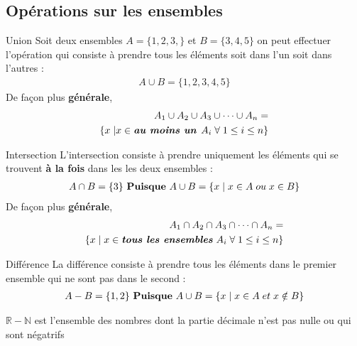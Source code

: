 \documentclass[8pt]{report}
\begin{document}
\begin{multicols*}{2}
\section{Opérations sur les ensembles}
\begin{Definitionx*}{Union}{}
  Soit deux ensembles $A = \{1, 2, 3,\}$ et $B = \{3, 4, 5\}$ on peut effectuer l'opération qui
  consiste à prendre tous les éléments soit dans l'un soit dans l'autres :
  \begin{align*}
    A \cup B = \{1, 2, 3, 4, 5\}
  \end{align*}
  De façon plus \textbf{générale}, 
  \begin{align*}
      A_1\cup A_2\cup A_3\cup\cdots\cup A_n = \\
      \{x \; |  x \in \textbf{\textit{au moins  un }}  A_i \; \forall \; 1 \leq i \leq n\}         
  \end{align*}
\end{Definitionx*} 
\begin{Definitionx*}{Intersection}{}
  L'intersection consiste à prendre uniquement les éléments qui se trouvent \textbf{à la fois} dans les 
  les deux ensembles :
  \begin{align*}
    A \cap B = \{3\} \text{ \textbf{Puisque} } A \cup B = \{x \; | \; x \in A \; ou \;x \in B \}
  \end{align*}
    De façon plus \textbf{générale}, 
  \begin{align*}
    A_1\cap A_2\cap A_3\cap\cdots\cap A_n = \\ 
    \{x \; | \; x \in \textit{\textbf{tous les ensembles} } A_i \; \forall \; 1 \leq i \leq n\}         
  \end{align*}



\end{Definitionx*}

\begin{Definitionx*}{Différence}{}
  La différence consiste à prendre tous les éléments dans le premier ensemble qui ne sont pas dans 
  le second :
  \begin{align*}
    A - B = \{1, 2\} \text{ \textbf{Puisque} } A \cup B = \{x \; | \; x \in A \; et \;x \notin B\}
  \end{align*}
\end{Definitionx*} 

\begin{EExample}{}{}
  $\mathbb{R} - \mathbb{N}$ est l'ensemble des nombres dont la partie décimale n'est pas nulle 
  ou qui sont négatrifs 
\end{EExample}



\end{multicols*}
\end{document}
